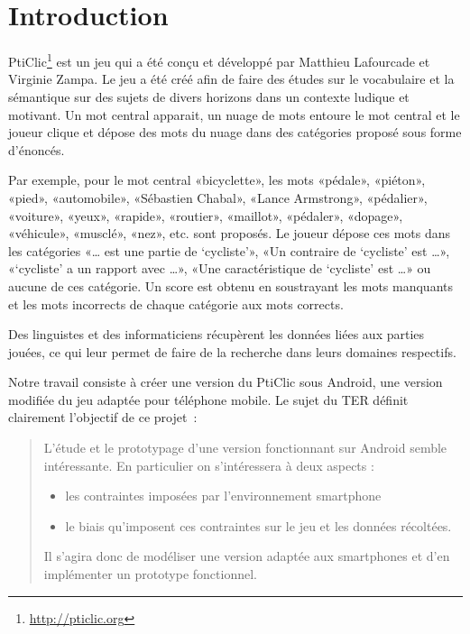 \documentclass[a4paper,11pt,french]{article}
\def\android{Android\texttrademark{}}
\begin{document}
\section{Introduction}

PtiClic\footnote{\url{http://pticlic.org}} est un jeu qui a été conçu et développé par Matthieu Lafourcade et Virginie Zampa. Le jeu a été créé afin de faire des études sur le vocabulaire et la sémantique sur des sujets de divers horizons dans un contexte ludique et motivant. Un mot central apparait, un nuage de mots entoure le mot central et le joueur clique et dépose des mots du nuage dans des catégories proposé sous forme d'énoncés. 

Par exemple, pour le mot central «bicyclette», les mots «pédale», «piéton», «pied», «automobile», «Sébastien Chabal», «Lance Armstrong», «pédalier», «voiture», «yeux», «rapide», «routier», «maillot», «pédaler», «dopage», «véhicule», «musclé», «nez», etc. sont proposés. Le joueur dépose ces mots dans les catégories «\dots{} est une partie de `cycliste'», «Un contraire de `cycliste' est \dots{}», «`cycliste' a un rapport avec \dots{}»,  «Une caractéristique de `cycliste' est \dots{}» ou aucune de ces catégorie. Un score est obtenu en soustrayant les mots manquants et les mots incorrects de chaque catégorie aux mots corrects. 

Des linguistes et des informaticiens récupèrent les données liées aux parties jouées, ce qui leur permet de faire de la recherche dans leurs domaines respectifs.

Notre travail consiste à créer une version du PtiClic sous \android{}, une version modifiée du jeu adaptée pour téléphone mobile. Le sujet du TER définit clairement l'objectif de ce projet~:

\begin{quotation}
\noindent  L'étude et le prototypage d'une version fonctionnant sur \android{} semble intéressante. En particulier on s'intéressera à deux aspects :
  \begin{itemize}
  \item les contraintes imposées par l'environnement smartphone
  \item le biais qu'imposent ces contraintes sur le jeu et les données récoltées.
  \end{itemize}
  
\noindent  Il s'agira donc de modéliser une version adaptée aux smartphones et d'en implémenter un prototype fonctionnel.
\end{quotation}
\end{document}
